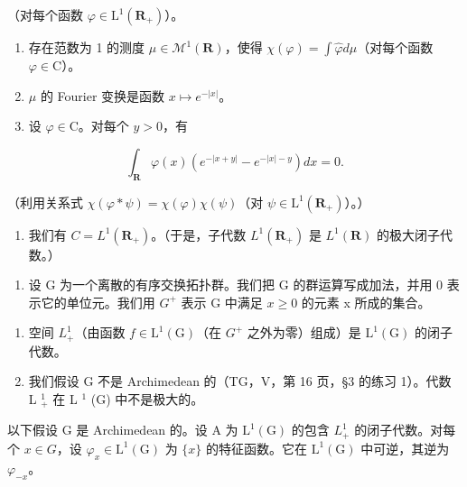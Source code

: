 （对每个函数 \(\varphi\in\mathrm{L}^{1}(\mathbf{R}_{+})\)）。

\begin{enumerate}
\def\labelenumi{\alph{enumi})}
\setcounter{enumi}{4}
\item
  存在范数为 1 的测度 \(\mu \in \mathcal{M}^1 (\mathbf{R})\)，使得 \(\chi (\varphi) = \int \widehat{\varphi} d\mu\)（对每个函数 \(\varphi \in \mathrm{C}\)）。
\item
  \(\mu\) 的 Fourier 变换是函数 \(x \mapsto e^{-|x|}\)。
\item
  设 \(\varphi \in \mathrm{C}\)。对每个 \(y > 0\)，有
\end{enumerate}

\[
\int_ {\mathbf {R}} \varphi (x) (e ^ {- | x + y |} - e ^ {- | x | - y}) d x = 0.
\]

（利用关系式 \(\chi (\varphi *\psi) = \chi (\varphi)\chi (\psi)\)（对 \(\psi \in \mathrm{L}^1 (\mathbf{R}_+)\)）。）

\begin{enumerate}
\def\labelenumi{\alph{enumi})}
\setcounter{enumi}{7}
\tightlist
\item
  我们有 \(C = L^{1}(\mathbf{R}_{+})\)。（于是，子代数 \(L^{1}(\mathbf{R}_{+})\) 是 \(L^{1}(\mathbf{R})\) 的极大闭子代数。）
\end{enumerate}

\begin{enumerate}
\def\labelenumi{\arabic{enumi})}
\setcounter{enumi}{17}
\tightlist
\item
  设 G 为一个离散的有序交换拓扑群。我们把 G 的群运算写成加法，并用 0 表示它的单位元。我们用 \(G^{+}\) 表示 G 中满足 \(x \geqslant 0\) 的元素 x 所成的集合。
\end{enumerate}

\begin{enumerate}
\def\labelenumi{\alph{enumi})}
\item
  空间 \(L_{+}^{1}\)（由函数 \(f \in \mathrm{L}^{1}(\mathrm{G})\)（在 \(G^{+}\) 之外为零）组成）是 \(\mathrm{L}^{1}(\mathrm{G})\) 的闭子代数。
\item
  我们假设 G 不是 Archimedean 的（TG，V，第 16 页，§3 的练习 1）。代数 L \(_{+}^{1}\) 在 L \(^{1}\) (G) 中不是极大的。
\end{enumerate}

以下假设 G 是 Archimedean 的。设 A 为 \(\mathrm{L}^{1}(\mathrm{G})\) 的包含 \(L_{+}^{1}\) 的闭子代数。对每个 \(x \in G\)，设 \(\varphi_{x} \in \mathrm{L}^{1}(\mathrm{G})\) 为 \(\{x\}\) 的特征函数。它在 \(\mathrm{L}^{1}(\mathrm{G})\) 中可逆，其逆为 \(\varphi_{-x}\)。

